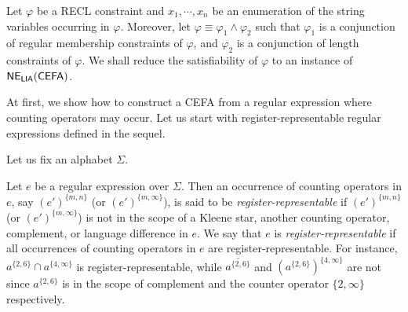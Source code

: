 Let $\varphi$ be a RECL constraint and $x_1, \cdots, x_n$ be an enumeration of the string variables occurring in $\varphi$. Moreover, let $\varphi \equiv \varphi_1 \wedge \varphi_2$ such that $\varphi_1$ is a conjunction of regular membership constraints of $\varphi$, and $\varphi_2$ is a conjunction of length constraints of $\varphi$.
We shall reduce the satisfiability of $\varphi$ to an instance of ${\sf NE_{LIA}(CEFA)}$. 

At first, we show how to construct a CEFA from a regular expression where counting operators may occur. 
Let us start with register-representable regular expressions defined in the sequel. 

Let us fix an alphabet $\Sigma$.

Let $e$ be a regular expression over $\Sigma$. Then an occurrence of counting operators in $e$, say $(e')^{\{m,n\}}$ (or $(e')^{\{m, \infty\}}$), is said to be \emph{register-representable} if $(e')^{\{m,n\}}$ (or $(e')^{\{m, \infty\}}$) is not in the scope of a Kleene star, another counting operator, complement, or language difference in $e$. We say that $e$ is \emph{register-representable} if all occurrences of counting operators in $e$ are register-representable. For instance, $a^{\{2, 6\}} \cap a^{\{4, \infty\}}$ is register-representable, while $\overline{a^{\{2, 6\}}}$ and $(a^{\{2, 6\}})^{\{4,\infty\}}$ are not since $a^{\{2,6\}}$ is in the scope of complement and the counter operator $\{2, \infty\}$ respectively.  

